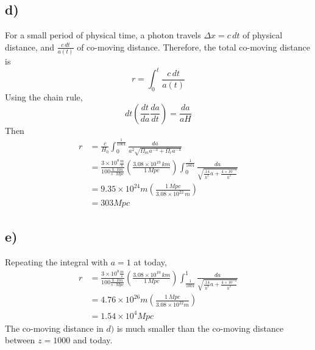 \documentclass{article}
\begin{document}
\subsection*{d)}
For a small period of physical time, a photon travels $\Delta x = c\,dt$ of physical distance, and $\frac{c\,dt}{a(t)}$ of co-moving distance. Therefore, the total co-moving distance is
\[r=\int_0^t \frac{c\,dt}{a(t)}\]
Using the chain rule,
\[dt\left(\frac{dt}{da}\frac{da}{dt}\right) = \frac{da}{aH}\]
Then
\begin{align*}
r&=\frac{c}{H_0}\int_0^{\frac{1}{1001}}\frac{da}{a^2\sqrt{\Omega_m a^{-3}+\Omega_r a^{-4}}}\\
&=\frac{3\times 10^8 \frac{m}{s}}{100 \frac{h\cdot km}{s\cdot Mpc}}\left(\frac{3.08\times 10^{19}\,km}{1\,Mpc}\right)\int_0^{\frac{1}{1001}} \frac{da}{\sqrt{\frac{.14}{h^2}a+\frac{4\times 10^{-5}}{h^2}}}\\
&= 9.35\times 10^{24}m \left(\frac{1\,Mpc}{3.08\times 10^{22}\,m}\right)\\
&= 303 Mpc
\end{align*}
\subsection*{e)}
Repeating the integral with $a=1$ at today,
\begin{align*}
r&=\frac{3\times 10^8 \frac{m}{s}}{100 \frac{h\cdot km}{s\cdot Mpc}}\left(\frac{3.08\times 10^{19}\,km}{1\,Mpc}\right)\int_\frac{1}{1001}^1 \frac{da}{\sqrt{\frac{.14}{h^2}a+\frac{4\times 10^{-5}}{h^2}}}\\
&=4.76\times 10^{26} m\left(\frac{1\,Mpc}{3.08\times 10^{22}m}\right)\\
&=1.54\times 10^4 Mpc
\end{align*}
The co-moving distance in $d)$ is much smaller than the co-moving distance between $z=1000$ and today.
\end{document}
